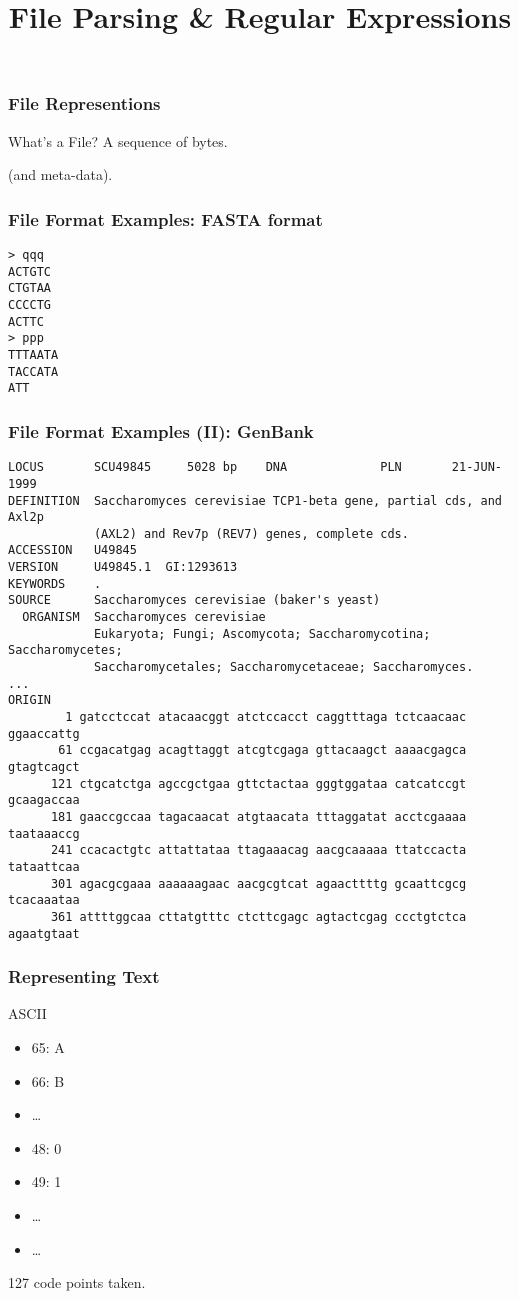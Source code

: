 
\title{File Parsing \& Regular Expressions}

\frame{\maketitle}

\begin{frame}[fragile]
\frametitle{File Representions}
\begin{block}{What's a File?}
A sequence of bytes.

\bigskip
(and meta-data).
\end{block}
\end{frame}

\begin{frame}[fragile]
\frametitle{File Format Examples: FASTA format}
\begin{verbatim}
> qqq
ACTGTC
CTGTAA
CCCCTG
ACTTC
> ppp
TTTAATA
TACCATA
ATT
\end{verbatim}
\end{frame}

\begin{frame}[fragile]
\frametitle{File Format Examples (II): GenBank}

\begin{verbatim}
LOCUS       SCU49845     5028 bp    DNA             PLN       21-JUN-1999
DEFINITION  Saccharomyces cerevisiae TCP1-beta gene, partial cds, and Axl2p
            (AXL2) and Rev7p (REV7) genes, complete cds.
ACCESSION   U49845
VERSION     U49845.1  GI:1293613
KEYWORDS    .
SOURCE      Saccharomyces cerevisiae (baker's yeast)
  ORGANISM  Saccharomyces cerevisiae
            Eukaryota; Fungi; Ascomycota; Saccharomycotina; Saccharomycetes;
            Saccharomycetales; Saccharomycetaceae; Saccharomyces.
...
ORIGIN
        1 gatcctccat atacaacggt atctccacct caggtttaga tctcaacaac ggaaccattg
       61 ccgacatgag acagttaggt atcgtcgaga gttacaagct aaaacgagca gtagtcagct
      121 ctgcatctga agccgctgaa gttctactaa gggtggataa catcatccgt gcaagaccaa
      181 gaaccgccaa tagacaacat atgtaacata tttaggatat acctcgaaaa taataaaccg
      241 ccacactgtc attattataa ttagaaacag aacgcaaaaa ttatccacta tataattcaa
      301 agacgcgaaa aaaaaagaac aacgcgtcat agaacttttg gcaattcgcg tcacaaataa
      361 attttggcaa cttatgtttc ctcttcgagc agtactcgag ccctgtctca agaatgtaat
\end{verbatim}
\end{frame}

\begin{frame}[fragile]
\frametitle{Representing Text}
\begin{block}{ASCII}
\begin{itemize}
\item 65: A
\item 66: B
\item \ldots
\item 48: 0
\item 49: 1
\item \ldots
\item \ldots
\end{itemize}

127 code points taken.
\end{block}
\end{frame}

